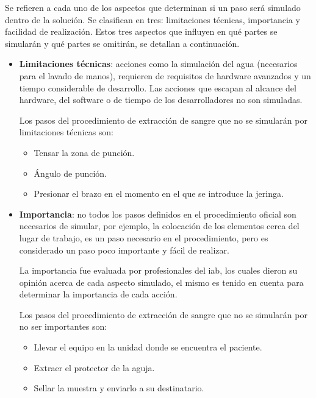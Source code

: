 Se refieren a cada uno de los aspectos que determinan si un paso 
será simulado dentro de la solución. Se clasifican en tres: limitaciones técnicas, 
importancia y facilidad de realización. Estos tres aspectos que influyen en qué partes se simularán y qué partes se omitirán, se detallan a continuación.

\begin{itemize}
\item  \textbf{Limitaciones técnicas}: acciones como la simulación del agua        
    (necesarios para el lavado de manos), requieren de requisitos de
    hardware avanzados y un tiempo considerable de desarrollo. Las acciones
    que escapan al alcance del hardware, del software o de tiempo de los
    desarrolladores no son simuladas.
        
    Los pasos del procedimiento de extracción de sangre que no se simularán por 
    limitaciones técnicas son:
    \begin{itemize}
        \item Tensar la zona de punción.
        \item Ángulo de punción.
        \item Presionar el brazo en el momento en el que se introduce la jeringa.
    \end{itemize}
    
    
\item  \textbf{Importancia}: no todos los pasos definidos en el procedimiento        
    oficial son necesarios de simular, por ejemplo, la colocación de los
    elementos cerca del lugar de trabajo, es un paso necesario en el
    procedimiento, pero es considerado un paso poco importante y fácil de
    realizar.

    La importancia fue evaluada por profesionales del \Gls{iab}, los
    cuales dieron su opinión acerca de cada aspecto simulado, el mismo
    es tenido en cuenta para determinar la importancia de cada
    acción.
    
    Los pasos del procedimiento de extracción de sangre que no se simularán por 
    no ser importantes son:
    \begin{itemize}
        \item Llevar el equipo en la unidad donde se encuentra el paciente.
        \item Extraer el protector de la aguja.
        \item Sellar la muestra y enviarlo a su destinatario.
    \end{itemize}
    

\end{itemize}
